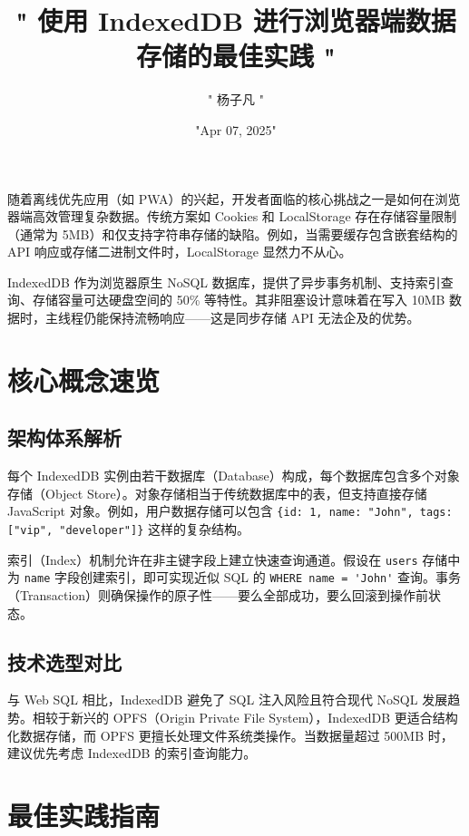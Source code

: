 \title{" 使用 IndexedDB 进行浏览器端数据存储的最佳实践 "}
\author{" 杨子凡 "}
\date{"Apr 07, 2025"}
\maketitle
随着离线优先应用（如 PWA）的兴起，开发者面临的核心挑战之一是如何在浏览器端高效管理复杂数据。传统方案如 Cookies 和 LocalStorage 存在存储容量限制（通常为 5MB）和仅支持字符串存储的缺陷。例如，当需要缓存包含嵌套结构的 API 响应或存储二进制文件时，LocalStorage 显然力不从心。\par
IndexedDB 作为浏览器原生 NoSQL 数据库，提供了异步事务机制、支持索引查询、存储容量可达硬盘空间的 50\%{} 等特性。其非阻塞设计意味着在写入 10MB 数据时，主线程仍能保持流畅响应——这是同步存储 API 无法企及的优势。\par
\chapter{核心概念速览}
\section{架构体系解析}
每个 IndexedDB 实例由若干数据库（Database）构成，每个数据库包含多个对象存储（Object Store）。对象存储相当于传统数据库中的表，但支持直接存储 JavaScript 对象。例如，用户数据存储可以包含 \verb!{id: 1, name: "John", tags: ["vip", "developer"]}! 这样的复杂结构。\par
索引（Index）机制允许在非主键字段上建立快速查询通道。假设在 \verb!users! 存储中为 \verb!name! 字段创建索引，即可实现近似 SQL 的 \verb!WHERE name = 'John'! 查询。事务（Transaction）则确保操作的原子性——要么全部成功，要么回滚到操作前状态。\par
\section{技术选型对比}
与 Web SQL 相比，IndexedDB 避免了 SQL 注入风险且符合现代 NoSQL 发展趋势。相较于新兴的 OPFS（Origin Private File System），IndexedDB 更适合结构化数据存储，而 OPFS 更擅长处理文件系统类操作。当数据量超过 500MB 时，建议优先考虑 IndexedDB 的索引查询能力。\par
\chapter{最佳实践指南}
